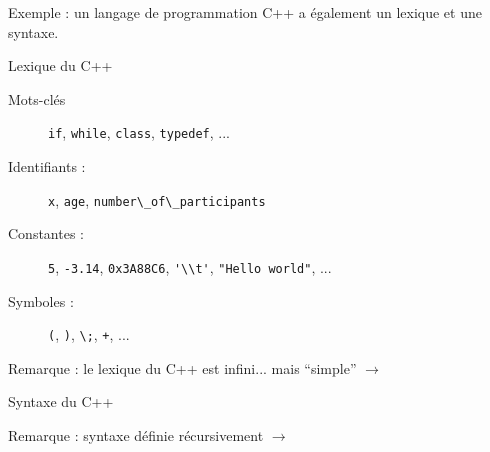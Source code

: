 
\begingroup


\begin{frame}{Exemple : un langage de programmation}
  C++ a également un lexique et une syntaxe.
  \begin{block}{Lexique du C++}
    \begin{description}
    \item[Mots-clés] \lstinline{if}, \lstinline{while}, \lstinline{class}, \lstinline{typedef}, ...
    \item[Identifiants :] \lstinline{x}, \lstinline{age}, \lstinline{number\_of\_participants}
    \item[Constantes :] \lstinline{5}, \lstinline{-3.14}, \lstinline{0x3A88C6}, \lstinline{'\\t'}, \lstinline{"Hello world"}, ...
    \item[Symboles :] \lstinline{(}, \lstinline{)}, \lstinline{\;}, \lstinline{+}, ...
    \end{description}
    \alert{Remarque :} le lexique du C++ est infini... mais ``simple'' $\rightarrow$ 
  \end{block}
  
  \begin{block}{Syntaxe du C++}
    \alert{Remarque :} syntaxe définie récursivement $\rightarrow$ 
  \end{block}
\end{frame}
\endgroup
